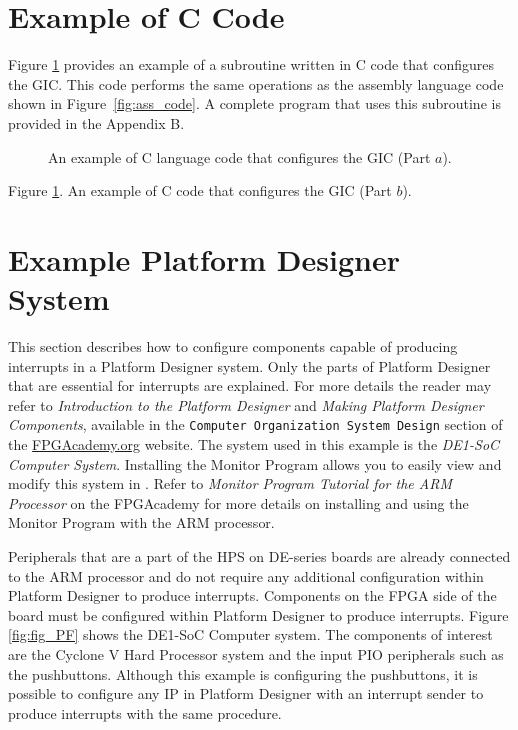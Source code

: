 \documentclass[11pt, twoside, pdftex]{article}
\begin{document}
\newpage
\section{Example of C Code}
\label{sec:C_code} Figure \ref{fig:C_code} provides an example of a subroutine written in
C code that configures the GIC. This code performs the same operations as the assembly
language code shown in Figure~\ref{fig:ass_code}.  A complete program that uses 
this subroutine is provided in the Appendix B.

\begin{figure}[h!]
\begin{center}

\end{center}
\caption{An example of C language code that configures the GIC (Part $a$).}
   \label{fig:C_code}
\end{figure}

\clearpage
\begin{center}

\end{center}
\begin{center}
Figure \ref{fig:C_code}. An example of C code that configures the GIC (Part $b$).
\end{center}

\newpage
\section{Example Platform Designer System}
\label{sec:PF_Sys} This section describes how to configure components capable of producing 
interrupts in a Platform Designer system. Only the parts of Platform Designer that are essential 
for interrupts are explained. For more details the reader may refer to 
{\it Introduction to the Platform Designer} and {\it Making Platform Designer Components},
available in the 
\texttt{Computer Organization System Design} section of the 
{\small \href{https://www.fpgacademy.org/tutorials.html} {FPGAcademy.org}} website.
The system used in this example is 
the {\it DE1-SoC Computer System}. Installing the  Monitor Program allows you to easily view 
and modify this system in . 
Refer to {\it Monitor Program Tutorial for the ARM Processor} on the FPGAcademy
for more details on installing and using the Monitor Program with the ARM processor.

Peripherals that are a part of the HPS on DE-series boards are already connected to the ARM processor and do not require any additional configuration within Platform Designer to produce interrupts. Components on the FPGA side of the board must be configured within Platform Designer to produce interrupts. Figure \ref{fig:fig_PF} shows the DE1-SoC Computer system. The components of interest are
the Cyclone V Hard Processor system and the input PIO peripherals such as the pushbuttons. Although this example is configuring the pushbuttons, it is possible to configure any IP in Platform Designer with an interrupt sender to produce interrupts with the same procedure.
\end{document}
